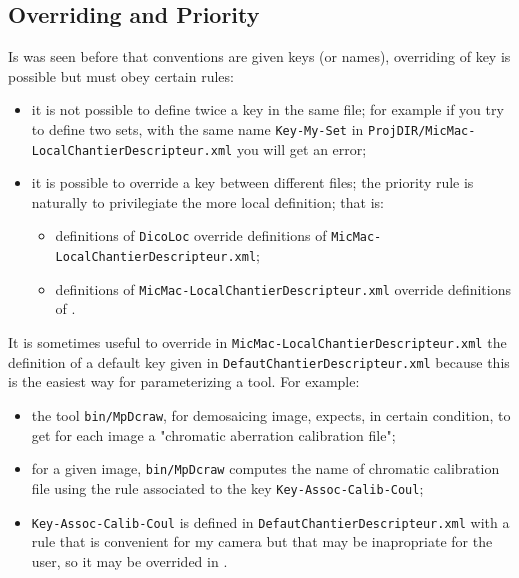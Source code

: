 \subsection{Overriding and Priority} 

Is was seen before that conventions are given keys (or names), overriding
of key is possible but must obey certain rules:

\begin{itemize}
   \item it is not possible to define twice a key in the same file; for example
         if you try to define two sets, with the same name {\tt Key-My-Set} in 
         {\tt ProjDIR/MicMac-LocalChantierDescripteur.xml}  you will get an error;

   \item it is possible to override a key between different files; the priority rule
         is naturally to privilegiate the more local definition; that is: 

\begin{itemize}
             \item definitions of {\tt DicoLoc} override definitions of 
                    {\tt MicMac-LocalChantierDescripteur.xml};
             \item definitions of {\tt MicMac-LocalChantierDescripteur.xml}
                   override definitions of .
\end{itemize}

\end{itemize}

It is sometimes useful to override in {\tt MicMac-LocalChantierDescripteur.xml} the
definition of a default key given in {\tt DefautChantierDescripteur.xml} because this is 
the easiest way for parameterizing a tool. For example:

\begin{itemize}
    \item the tool {\tt bin/MpDcraw}, for demosaicing image, expects, in certain 
          condition, to get for each image a "chromatic aberration calibration file";

    \item  for 	a given image, {\tt bin/MpDcraw} computes the name of chromatic calibration file
           using the rule associated to the key {\tt Key-Assoc-Calib-Coul};

    \item  {\tt Key-Assoc-Calib-Coul} is defined in  {\tt DefautChantierDescripteur.xml} 
           with a rule that is convenient for my camera but that may be inapropriate
           for the user, so it may be overrided in .
\end{itemize}


